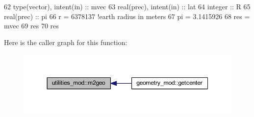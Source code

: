 \begin{DoxyCode}
62     \textcolor{keywordtype}{type}(vector), \textcolor{keywordtype}{intent(in)} :: mvec
63     \textcolor{keywordtype}{real(prec)}, \textcolor{keywordtype}{intent(in)} :: lat
64     \textcolor{keywordtype}{integer} :: R
65     \textcolor{keywordtype}{real(prec)} :: pi
66     r = 6378137 \textcolor{comment}{!earth radius in meters}
67     pi = 3.1415926
68     res = mvec
69     res%
70     res%
\end{DoxyCode}
Here is the caller graph for this function\+:
\nopagebreak
\begin{figure}[H]
\begin{center}
\leavevmode
\includegraphics[width=350pt]{namespaceutilities__mod_ac4f9ec7e3dc3683a4e79e462d89a90b9_icgraph}
\end{center}
\end{figure}
